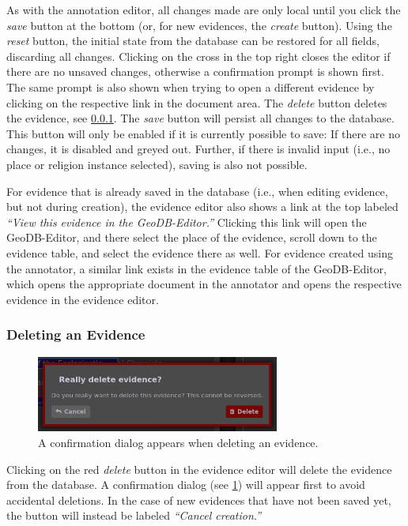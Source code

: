 As with the annotation editor, all changes made are only local until you click the \emph{save} button at the bottom (or, for new evidences, the \emph{create} button).
Using the \emph{reset} button, the initial state from the database can be restored for all fields, discarding all changes.
Clicking on the cross in the top right closes the editor if there are no unsaved changes, otherwise a confirmation prompt is shown first.
The same prompt is also shown when trying to open a different evidence by clicking on the respective link in the document area.
The \emph{delete} button deletes the evidence, see \cref{sec:evidence-deletion}.
The \emph{save} button will persist all changes to the database.
This button will only be enabled if it is currently possible to save:
If there are no changes, it is disabled and greyed out.
Further, if there is invalid input (i.e., no place or religion instance selected), saving is also not possible.

For evidence that is already saved in the database (i.e., when editing evidence, but not during creation), the evidence editor also shows a link at the top labeled \emph{\enquote{View this evidence in the GeoDB-Editor.}}
Clicking this link will open the GeoDB-Editor, and there select the place of the evidence, scroll down to the evidence table, and select the evidence there as well.
For evidence created using the annotator, a similar link exists in the evidence table of the GeoDB-Editor, which opens the appropriate document in the annotator and opens the respective evidence in the evidence editor.


\subsubsection{Deleting an Evidence}
\label{sec:evidence-deletion}

\begin{figure}[htb]
  \centering
  \includegraphics[width=8cm]{../src/assets/annotator-documentation/delete-evidence.png}

  \caption{A confirmation dialog appears when deleting an evidence.}
  \label{fig:delete-evidence}
\end{figure}

Clicking on the red \emph{delete} button in the evidence editor will delete the evidence from the database.
A confirmation dialog (see \cref{fig:delete-evidence}) will appear first to avoid accidental deletions.
In the case of new evidences that have not been saved yet, the button will instead be labeled \emph{\enquote{Cancel creation.}}

